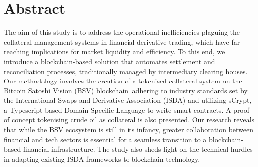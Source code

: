 \section*{Abstract}
The aim of this study is to address the operational inefficiencies plaguing the collateral management systems in financial derivative trading, which have far-reaching implications for market liquidity and efficiency. To this end, we introduce a blockchain-based solution that automates settlement and reconciliation processes, traditionally managed by intermediary clearing houses. Our methodology involves the creation of a tokenised collateral system on the Bitcoin Satoshi Vision (BSV) blockchain, adhering to industry standards set by the International Swaps and Derivative Association (ISDA) and utilizing sCrypt, a Typescript-based Domain Specific Language to write smart contracts. A proof of concept tokenising crude oil as collateral is also presented. Our research reveals that while the BSV ecosystem is still in its infancy, greater collaboration between financial and tech sectors is essential for a seamless transition to a blockchain-based financial infrastructure. The study also sheds light on the technical hurdles in adapting existing ISDA frameworks to blockchain technology.